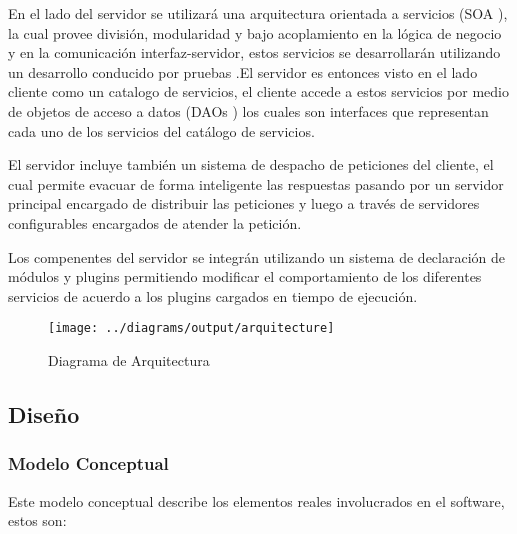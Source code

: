 En el lado del servidor se utilizará una arquitectura orientada a servicios (SOA \cite{soa}), la cual provee división, modularidad y bajo acoplamiento en la lógica de negocio y en la comunicación interfaz-servidor, estos servicios se desarrollarán utilizando un desarrollo conducido por pruebas \cite{tdd}.\newline El servidor es entonces visto en el lado cliente como un catalogo de servicios, el cliente accede a estos servicios por medio de objetos de acceso a datos (DAOs \cite{dao} ) los cuales son interfaces que representan cada uno de los servicios del catálogo de servicios.

El servidor incluye también un sistema de despacho de peticiones del cliente, el cual permite evacuar de forma inteligente las respuestas pasando por un servidor principal encargado de distribuir las peticiones y luego a través de servidores configurables encargados de atender la petición.

Los compenentes del servidor se integrán utilizando un sistema de declaración de módulos y plugins permitiendo modificar el comportamiento de los diferentes servicios de acuerdo a los plugins cargados en tiempo de ejecución.

\begin{landscape}
\begin{figure}
 \centering
 \texttt{[image: ../diagrams/output/arquitecture]}
 \caption{Diagrama de Arquitectura}
 \label{diagrama:arquitectura}
\end{figure}
\end{landscape}


\subsection{Diseño}

\subsubsection{Modelo Conceptual}

Este modelo conceptual describe los elementos reales involucrados en el software, estos son:

